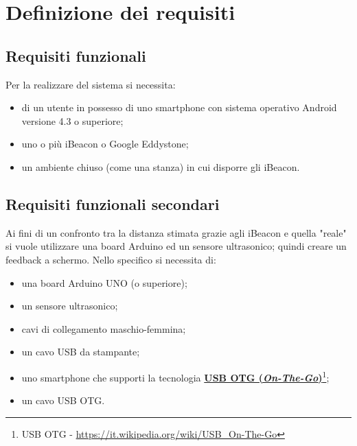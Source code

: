 \chapter{Definizione dei requisiti}
\section{Requisiti funzionali}
Per la realizzare del sistema si necessita:
\begin{itemize}
	\item di un utente in possesso di uno smartphone con sistema operativo Android versione 4.3 o superiore;
	
	\item uno o più iBeacon o Google Eddystone;
	
	\item un ambiente chiuso (come una stanza) in cui disporre gli iBeacon.
\end{itemize}

\section{Requisiti funzionali secondari}
Ai fini di un confronto tra la distanza stimata grazie agli iBeacon e quella "reale" si vuole utilizzare una board Arduino ed un sensore ultrasonico; quindi creare un feedback a schermo. 
Nello specifico si necessita di:
\begin{itemize}
	\item una board Arduino UNO (o superiore);
	
	\item un sensore ultrasonico;
	
	\item cavi di collegamento maschio-femmina;
	
	\item un cavo USB da stampante;
	
	\item uno smartphone che supporti la tecnologia \href{https://it.wikipedia.org/wiki/USB_On-The-Go}{\textbf{USB OTG (\textit{On-The-Go})}}\footnote{USB OTG - \url{https://it.wikipedia.org/wiki/USB_On-The-Go}};
	
	\item un cavo USB OTG.
\end{itemize}


